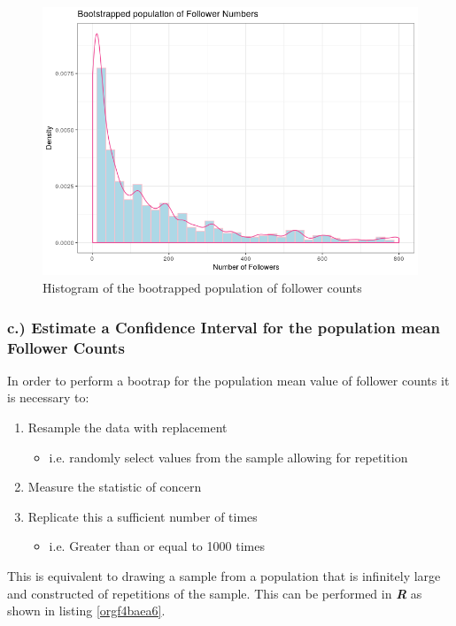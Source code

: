 \documentclass[11pt]{article}
\begin{document}
\begin{figure}[htbp]
\centering
\includegraphics[width=12cm]{./Figures/BootStrap_Pop.png}
\caption{\label{fig:org89570b2}Histogram of the bootrapped population of follower counts}
\end{figure}

\subsubsection{c.) Estimate a Confidence Interval for the population mean Follower Counts}
\label{sec:orga5f0493}
In order to perform a bootrap for the population mean value of follower counts it is necessary to:

\begin{enumerate}
\item Resample the data with replacement
\begin{itemize}
\item i.e. randomly select values from the sample allowing for repetition
\end{itemize}
\item Measure the statistic of concern
\item Replicate this a sufficient number of times
\begin{itemize}
\item i.e. Greater than or equal to 1000 times \cite[Ch. 5]{davison1997}
\end{itemize}
\end{enumerate}

This is equivalent to drawing a sample from a population that is infinitely large and constructed of repetitions of the sample. This can be performed in \textbf{\emph{R}} as shown in listing \ref{orgf4baea6}.
\end{document}
